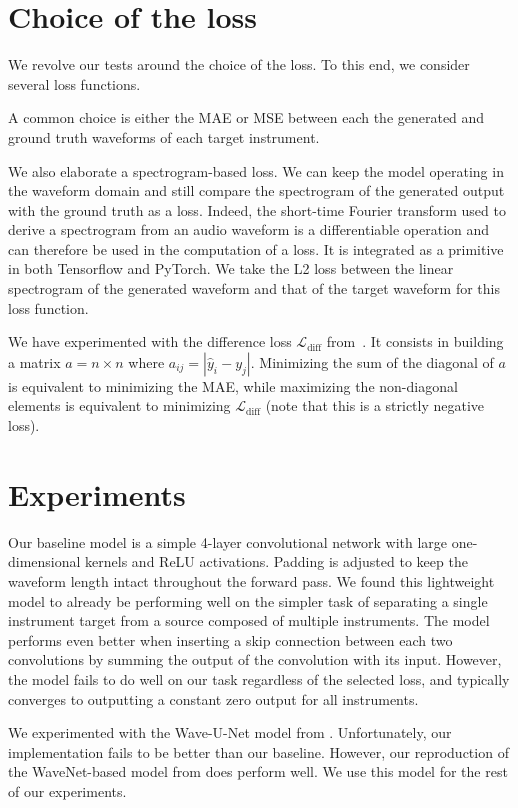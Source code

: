 \documentclass[twocolumn,superscriptaddress,aps]{revtex4-1}
\begin{document}
\section{Choice of the loss}
We revolve our tests around the choice of the loss. To this end, we consider several loss functions.

A common choice is either the MAE or MSE between each the generated and ground truth waveforms of each target instrument.

We also elaborate a spectrogram-based loss. We can keep the model operating in the waveform domain and still compare the spectrogram of the generated output with the ground truth as a loss. Indeed, the short-time Fourier transform used to derive a spectrogram from an audio waveform is a differentiable operation and can therefore be used in the computation of a loss. It is integrated as a primitive in both Tensorflow and PyTorch. We take the L2 loss between the linear spectrogram of the generated waveform and that of the target waveform for this loss function.

We have experimented with the difference loss $\mathcal{L}_{\text{diff}}$ from~\cite{SourceSeparationWaveformDomain}. It consists in building a matrix $a = n\times n$ where $a_{ij} = |\hat{y}_i - y_j|$. Minimizing the sum of the diagonal of $a$ is equivalent to minimizing the MAE, while maximizing the non-diagonal elements is equivalent to minimizing $\mathcal{L}_{\text{diff}}$ (note that this is a strictly negative loss).

\section{Experiments}
Our baseline model is a simple 4-layer convolutional network with large one-dimensional kernels and ReLU activations. Padding is adjusted to keep the waveform length intact throughout the forward pass. We found this lightweight model to already be performing well on the simpler task of separating a single instrument target from a source composed of multiple instruments. The model performs even better when inserting a skip connection between each two convolutions by summing the output of the convolution with its input. However, the model fails to do well on our task regardless of the selected loss, and typically converges to outputting a constant zero output for all instruments.

We experimented with the Wave-U-Net model from \cite{Wave-U-Net}. Unfortunately, our implementation fails to be better than our baseline. However, our reproduction of the WaveNet-based model from \cite{SourceSeparationWaveformDomain} does perform well. We use this model for the rest of our experiments.
\end{document}
